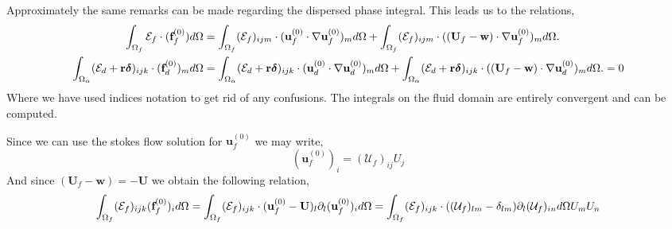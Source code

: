 Approximately the same remarks can be made regarding the  dispersed phase integral.
This leads us to the relations, 
\begin{align*}
    \int_{\Omega_f} \mathcal{E}_f \cdot  (\textbf{f}^{(0)}_f) d\Omega
    &=
    \int_{\Omega_f} (\mathcal{E}_f)_{ijm} \cdot (\textbf{u}_f^{(0)}\cdot \mathbf{\nabla} \textbf{u}_f^{(0)})_m d\Omega
    + \int_{\Omega_f} (\mathcal{E}_f)_{ijm} \cdot ((\textbf{U}_f - \textbf{w})\cdot \mathbf{\nabla} \textbf{u}_f^{(0)})_m d\Omega.\\
    \int_{\Omega_{\alpha}} (\mathcal{E}_d + \textbf{r}\bm\delta)_{ijk} \cdot (\textbf{f}_d^{(0)})_m d\Omega
    &=
    \int_{\Omega_{\alpha}} (\mathcal{E}_d + \textbf{r}\bm\delta)_{ijk} \cdot (\textbf{u}_d^{(0)}\cdot \mathbf{\nabla} \textbf{u}_d^{(0)})_m d\Omega
    + \int_{\Omega_{\alpha}} (\mathcal{E}_d + \textbf{r}\bm\delta)_{ijk} \cdot ((\textbf{U}_f - \textbf{w})\cdot \mathbf{\nabla} \textbf{u}_d^{(0)})_m d\Omega. =0 \\
\end{align*}
Where we have used indices notation to get rid of any confusions. 
The integrals on the fluid domain are entirely convergent and can be computed. 

Since we can use the stokes flow solution for $\textbf{u}^{(0)}_f$ we may write, 
\begin{equation*}
    (\textbf{u}^{(0)}_f)_i = (\mathcal{U}_f)_{ij} U_j
\end{equation*}
And since $(\textbf{U}_f - \textbf{w}) = - \textbf{U}$ we obtain the following relation, 
\begin{equation*}
    \int_{\Omega_f} (\mathcal{E}_f)_{ijk} (\textbf{f}^{(0)}_f)_i  d\Omega
    = 
    \int_{\Omega_f} (\mathcal{E}_f)_{ijk} \cdot (\textbf{u}_f^{(0)} - \textbf{U})_l \partial_l (\textbf{u}_f^{(0)})_i d\Omega
    =
    \int_{\Omega_f} (\mathcal{E}_f)_{ijk} \cdot ((\mathcal{U}_f)_{lm} - \delta_{lm}) \partial_l (\mathcal{U}_f)_{in}  d\Omega
    U_m U_n
\end{equation*}

